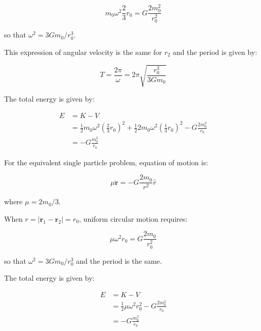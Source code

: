 \documentclass[12pt]{article}
\begin{document}
\begin{equation}
    m_{0} \omega^{2} \frac{2}{3} r_{0} = G \frac{2m_{0}^{2}}{r_{0}^{2}}
\end{equation}

so that $\omega^{2} = 3Gm_{0}/r_{0}^{3}$.

This expression of angular velocity is the same for $r_{2}$ and the period is given by:

\begin{equation}
    T = \frac{2\pi}{\omega} = 2\pi \sqrt{\frac{r_{0}^{3}}{3Gm_{0}}}
\end{equation}

The total energy is given by:

\begin{equation}
\begin{split}
    E &= K - V \\
    &= \frac{1}{2} m_{0} \omega^{2} \left( \frac{2}{3} r_{0} \right)^{2} + \frac{1}{2} 2m_{0} \omega^{2} \left( \frac{1}{3} r_{0} \right)^{2} - G\frac{2m_{0}^{2}}{r_{0}} \\
    &= -G \frac{m_{0}^{2}}{r_{0}}
\end{split}
\end{equation}

For the equivalent single particle problem, equation of motion is:

\begin{equation}
    \mu \ddot{\mathbf{r}} = -G \frac{2m_{0}}{r^{2}} \hat{r}
\end{equation}

where $\mu = 2m_{0}/3$.

When $r = \left\lvert \mathbf{r}_{1} - \mathbf{r}_{2} \right\rvert = r_{0}$, uniform circular motion requires:

\begin{equation}
    \mu \omega^{2} r_{0} = G \frac{2m_{0}}{r_{0}^{2}}
\end{equation}

so that $\omega^{2} = 3Gm_{0}/r_{0}^{3}$ and the period is the same.

The total energy is given by:

\begin{equation}
\begin{split}
    E &= K - V \\
    &= \frac{1}{2} \mu \omega^{2} r_{0}^{2} - G \frac{2m_{0}^{2}}{r_{0}} \\
    &= -G \frac{m_{0}^{2}}{r_{0}}
\end{split}
\end{equation}
\end{document}
